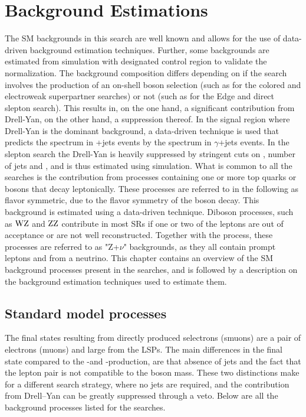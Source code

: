 \chapter{Background Estimations}\label{sec:backgrounds}
\noindent
\justify
The SM backgrounds in this search are well known and allows for the use of data-driven background estimation techniques. 
Further, some backgrounds are estimated from simulation with designated control region to validate the normalization. 
The background composition differs depending on if the search involves the production of an on-shell \PZ boson selection (such as for the colored and electroweak superpartner searches) or not (such as for the Edge and direct slepton search). 
This results in, on the one hand, a significant contribution from Drell-Yan, on the other hand, a suppression thereof. 
In the signal region where Drell-Yan is the dominant background, a data-driven technique is used that predicts the \ptmiss spectrum in \PZ+jets events by the \ptmiss spectrum in $\gamma$+jets events.
In the slepton search the Drell-Yan is heavily suppressed by stringent cuts on \ptmiss, number of jets and \mttwo, and is thus estimated using simulation.  
What is common to all the searches is the contribution from processes containing one or more top quarks or \PW bosons that decay leptonically. 
These processes are referred to in the following as flavor symmetric, due to the flavor symmetry of the \PW boson decay. 
This background is estimated using a data-driven technique. 
Diboson processes, such as $\mathrm{WZ}$ and $\mathrm{ZZ}$ contribute in most SRs if one or two of the leptons are out of acceptance or are not well reconstructed. 
Together with the \ttZ process, these processes are referred to as "Z+$\nu$" backgrounds, as they all contain prompt leptons and \ptmiss from a neutrino.   
This chapter contains an overview of the SM background processes present in the searches, and is followed by a description on the background estimation techniques used to estimate them. 
\newpage
\section{Standard model processes}
\noindent\justify
The final states resulting from directly produced selectrons (smuons) are a pair of electrons (muons) and large \ptmiss from the LSPs. 
The main differences in the final state compared to the \firstcharg-\secondchi and \firstchi-\firstchi production, are that absence of jets and the fact that the lepton pair is not compatible to the \PZ boson mass. 
These two distinctions make for a different search strategy, where no jets are required, and the contribution from Drell--Yan can be greatly suppressed through a veto. 
Below are all the background processes listed for the searches. 
